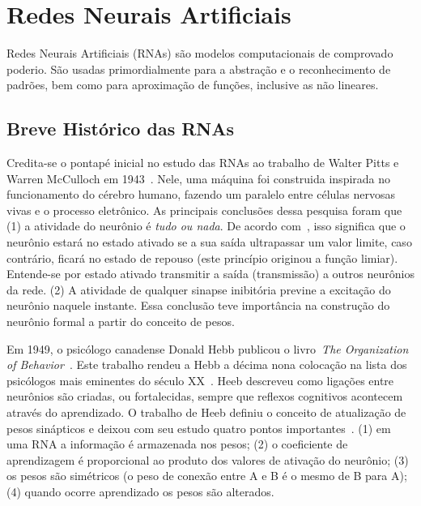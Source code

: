 \chapter{Redes Neurais Artificiais}
\label{Cap:RedesNeurais}

Redes Neurais Artificiais (RNAs) são modelos computacionais de comprovado poderio. São usadas primordialmente para a abstração e o reconhecimento de padrões, bem como para aproximação de funções, inclusive as não lineares.

\section{Breve Histórico das RNAs}

Credita-se o pontapé inicial no estudo das RNAs ao trabalho de Walter Pitts e Warren McCulloch em 1943~\cite{McCulloch1943}. Nele, uma máquina foi construida inspirada no funcionamento do cérebro humano, fazendo um paralelo entre células nervosas vivas e o processo eletrônico. As principais conclusões dessa pesquisa foram que (1) a atividade do neurônio é \emph{tudo ou nada}. De acordo com~\cite{Cardon1994}, isso significa que o neurônio estará no estado ativado se a sua saída ultrapassar um valor limite, caso contrário, ficará no estado de repouso (este princípio originou a função limiar). Entende-se por estado ativado transmitir a saída (transmissão) a outros neurônios da rede. (2) A atividade de qualquer sinapse inibitória previne a excitação do neurônio naquele instante. Essa conclusão teve importância na construção do neurônio formal a partir do conceito de pesos.

Em 1949, o psicólogo canadense Donald Hebb publicou o livro~\emph{The Organization of Behavior}~\cite{Hebb1949}. Este trabalho rendeu a Hebb a décima nona colocação na lista dos psicólogos mais eminentes do século XX~\cite{Haggbloom2002}. Heeb descreveu como ligações entre neurônios são criadas, ou fortalecidas, sempre que reflexos cognitivos acontecem através do aprendizado. O trabalho de Heeb definiu o conceito de atualização de pesos sinápticos e deixou com seu estudo quatro pontos importantes~\cite{Eberhart19909}. (1) em uma RNA a informação é armazenada nos pesos; (2) o coeficiente de aprendizagem é proporcional ao produto dos valores de ativação do neurônio; (3) os pesos são simétricos (o peso de conexão entre A e B é o mesmo de B para A); (4) quando ocorre aprendizado os pesos são alterados.

